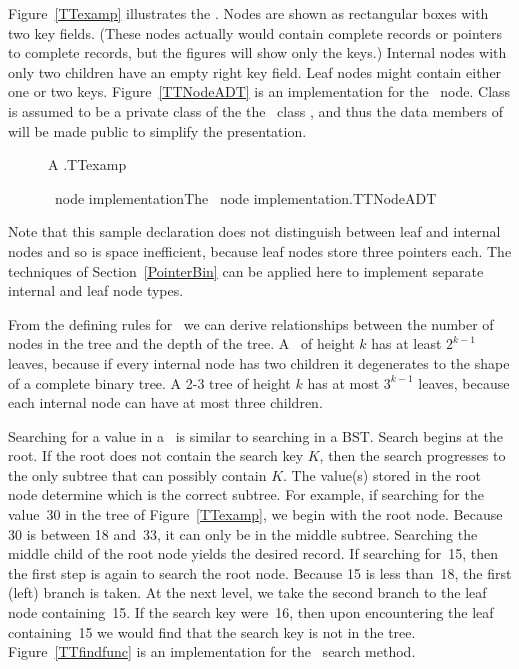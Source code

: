 Figure~\ref{TTexamp} illustrates the \TTtree.
Nodes are shown as rectangular boxes with two key fields.
(These nodes actually would contain complete records or pointers to
complete records, but the figures will show only the keys.)
Internal nodes with only two children have an empty right key field.
Leaf nodes might contain either one or two keys.
Figure~\ref{TTNodeADT} is an implementation for the \TTtree\ node.
{Class  is assumed to be a private class of the the
\TTtree\ class , and thus the data members of
 will be made public to simplify the presentation.}{}

\begin{figure}
\vspace{-\bigskipamount}\vspace{-\bigskipamount}\vspace{-\smallskipamount}

{A \TTtree.}{TTexamp}
\vspace{-\medskipamount}
\end{figure}

\begin{figure}

\capt{4.5in}
{\TTtree\ node implementation}{The \TTtree\ node implementation.}{TTNodeADT}
\end{figure}

Note that this sample declaration does not distinguish
between leaf and internal nodes and so is space inefficient, because
leaf nodes store three pointers each.
The techniques of Section~\ref{PointerBin} can be applied here to
implement separate internal and leaf node types.

From the defining rules for \TTtrees\ we can derive relationships
between the number of nodes in the tree and the depth of the tree.
A \TTtree\ of height \(k\) has at least \(2^{k-1}\) leaves, because if
every internal node has two children it degenerates to the shape
of a complete binary tree.
A 2-3 tree of height \(k\) has at most \(3^{k-1}\) leaves, because
each internal node can have at most three children.

Searching for a value in a \TTtree\ is similar to searching in a BST.
Search begins at the root.
If the root does not contain the search key \(K\), then the search
progresses to the only subtree that can possibly contain \(K\).
The value(s) stored in the root node determine which is the correct
subtree.
For example, if searching for the value~30 in the tree of
Figure~\ref{TTexamp}, we begin with the root node.
Because 30 is between 18 and~33, it can only be in the middle
subtree.
Searching the middle child of the root node yields the desired
record.
If searching for~15, then the first step is again to search the root
node.
Because 15 is less than~18, the first (left) branch is taken.
At the next level, we take the second branch to the leaf node
containing~15.
If the search key were~16, then upon encountering the leaf
containing~15 we would find that the search key is not in the tree.
Figure~\ref{TTfindfunc} is an implementation for the \TTtree\ search
method.

